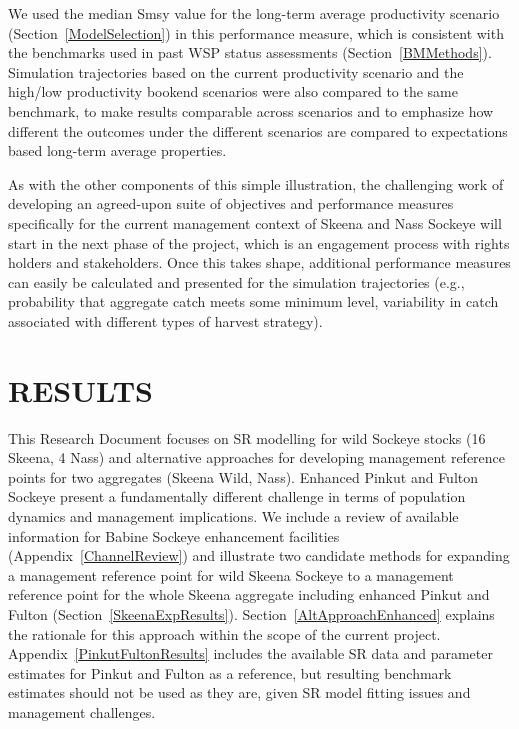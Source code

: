 \documentclass[french,11pt]{book}
\begin{document}
We used the median Smsy value for the long-term average productivity scenario (Section~\ref{ModelSelection}) in this performance measure, which is consistent with the benchmarks used in past WSP status assessments (Section~\ref{BMMethods}). Simulation trajectories based on the current productivity scenario and the high/low productivity bookend scenarios were also compared to the same benchmark, to make results comparable across scenarios and to emphasize how different the outcomes under the different scenarios are compared to expectations based long-term average properties.

As with the other components of this simple illustration, the challenging work of developing an agreed-upon suite of objectives and performance measures specifically for the current management context of Skeena and Nass Sockeye will start in the next phase of the project, which is an engagement process with rights holders and stakeholders. Once this takes shape, additional performance measures can easily be calculated and presented for the simulation trajectories (e.g., probability that aggregate catch meets some minimum level, variability in catch associated with different types of harvest strategy).

\section{RESULTS}\label{results}

This Research Document focuses on SR modelling for wild Sockeye stocks (16 Skeena, 4 Nass) and alternative approaches for developing management reference points for two aggregates (Skeena Wild, Nass). Enhanced Pinkut and Fulton Sockeye present a fundamentally different challenge in terms of population dynamics and management implications. We include a review of available information for Babine Sockeye enhancement facilities (Appendix~\ref{ChannelReview}) and illustrate two candidate methods for expanding a management reference point for wild Skeena Sockeye to a management reference point for the whole Skeena aggregate including enhanced Pinkut and Fulton (Section~\ref{SkeenaExpResults}). Section~\ref{AltApproachEnhanced} explains the rationale for this approach within the scope of the current project. Appendix~\ref{PinkutFultonResults} includes the available SR data and parameter estimates for Pinkut and Fulton as a reference, but resulting benchmark estimates should not be used as they are, given SR model fitting issues and management challenges.
\end{document}
